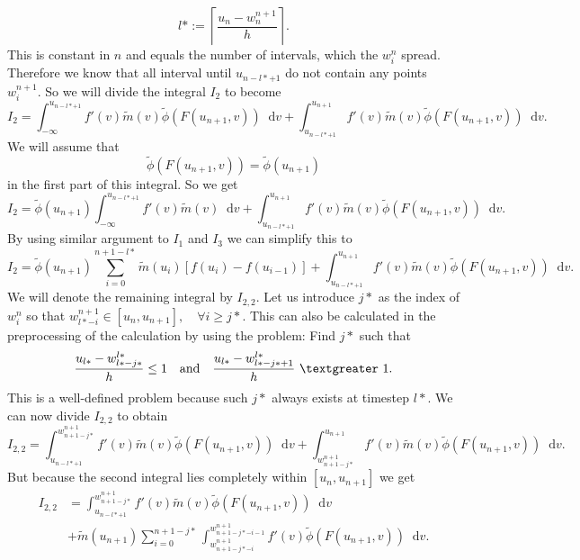 \documentclass[12pt,a4paper,twoside, open=right]{scrreprt}
\theoremstyle{definition}
\theoremstyle{plain}
\newcommand{\g}{~\textgreater ~}
\newcommand{\D}{\mathop{}\!\mathrm{d}}
\begin{document}
\begin{equation}
    l*:=\left\lceil  \frac{u_n -w_{n}^{n+1}}{h}\right\rceil.
\end{equation}
This is constant in $n$ and equals the number of intervals, which the $w_i^n$ spread. Therefore we know that all interval until $u_{n-l*+1}$ do not contain any points $w_i^{n+1}$. So we will divide the integral $I_2$ to become
\begin{equation}
    I_2 = \int_{-\infty}^{u_{n-l*+1}}f'(v)\tilde{m}(v)\tilde{\phi}(F(u_{n+1},v))\D v + \int_{u_{n-l* +1}}^{u_{n+1}}f'(v)\tilde{m}(v)\tilde{\phi}(F(u_{n+1},v))\D v.
\end{equation}
We will assume that \begin{equation}
    \tilde\phi(F(u_{n+1},v))=\tilde\phi(u_{n+1})
\end{equation}
in the first part of this integral. So we get 
\begin{equation}
    I_2 = \tilde\phi(u_{n+1})\int_{-\infty}^{u_{n-l*+1}}f'(v)\tilde{m}(v)\D v+ \int_{u_{n-l* +1}}^{u_{n+1}}f'(v)\tilde{m}(v)\tilde{\phi}(F(u_{n+1},v))\D v.
\end{equation}
By using similar argument to $I_1$ and $I_3$ we can simplify this to 
\begin{equation}
    I_2 = \tilde{\phi}(u_{n+1})\sum_{i=0}^{n+1-l*}\tilde{m}(u_i)[f(u_i)-f(u_{i-1})]+ \int_{u_{n-l* +1}}^{u_{n+1}}f'(v)\tilde{m}(v)\tilde{\phi}(F(u_{n+1},v))\D v.
\end{equation}
We will denote the remaining integral by $I_{2,2}$. Let us introduce $j*$ as the index of $w_i^{n}$ so that $w_{l*-i}^{n+1}\in[u_n,u_{n+1}],\quad\forall i\ge j*$. This can also be calculated in the preprocessing of the calculation by using the problem: Find $j*$ such that
\begin{equation}
    \frac{u_{l*}-w_{l*-j*}^{l*}}{h}\le 1 \quad \text{and} \quad\frac{u_{l*}-w_{l*-j*+1}^{l*}}{h}\g 1.
\end{equation}
This is a well-defined problem because such $j*$ always exists at timestep $l*$. We can now divide $I_{2,2}$ to obtain
\begin{equation}
    I_{2,2}= \int_{u_{n-l*+1}}^{w^{n+1}_{n+1-j*}}f'(v)\tilde{m}(v)\tilde{\phi}(F(u_{n+1},v))\D v + \int_{w^{n+1}_{n+1-j*}}^{u_{n+1}}f'(v)\tilde{m}(v)\tilde{\phi}(F(u_{n+1},v))\D v.
\end{equation}
But because the second integral lies completely within $[u_n,u_{n+1}]$ we get 
\begin{align}
    I_{2,2}&=\int_{u_{n-l*+1}}^{w^{n+1}_{n+1-j*}}f'(v)\tilde{m}(v)\tilde{\phi}(F(u_{n+1},v))\D v \\&+\tilde{m}(u_{n+1})\sum_{i=0}^{n+1-j*}\int_{w^{n+1}_{n+1-j*-i}}^{w^{n+1}_{n+1-j*-i-1}}f'(v)\tilde{\phi}(F(u_{n+1},v))\D v.
\end{align}
\end{document}
